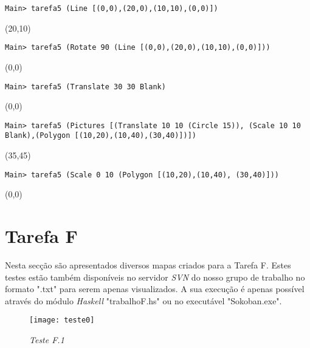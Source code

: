 \documentclass[a4paper,12pt]{report}
\begin{document}
\begin{tcolorbox}[width=\textwidth,colback={black},title={\sf Teste E.6:},outer arc=0mm,colupper=white]    
	{\footnotesize\tt *Main> tarefa5 (Line [(0,0),(20,0),(10,10),(0,0)])
		
		(20,10) }
\end{tcolorbox}

\begin{tcolorbox}[width=\textwidth,colback={black},title={\sf Teste E.7:},outer arc=0mm,colupper=white]    
	{\footnotesize\tt *Main> tarefa5 (Rotate 90 (Line [(0,0),(20,0),(10,10),(0,0)]))
		
		(0,0) }
\end{tcolorbox}

\begin{tcolorbox}[width=\textwidth,colback={black},title={\sf Teste E.8:},outer arc=0mm,colupper=white]    
	{\footnotesize\tt *Main> tarefa5 (Translate 30 30 Blank)
		
		(0,0) }
\end{tcolorbox}

\begin{tcolorbox}[width=\textwidth,colback={black},title={\sf Teste E.9:},outer arc=0mm,colupper=white]    
	{\footnotesize\tt *Main> tarefa5 (Pictures [(Translate 10 10 (Circle 15)), (Scale 10 10 Blank),(Polygon [(10,20),(10,40),(30,40)])])
		
		(35,45) }
\end{tcolorbox}

\begin{tcolorbox}[width=\textwidth,colback={black},title={\sf Teste E.10:},outer arc=0mm,colupper=white]    
	{\footnotesize\tt *Main> tarefa5 (Scale 0 10 (Polygon [(10,20),(10,40), (30,40)]))
		
		(0,0) }
	
\end{tcolorbox}


\section{Tarefa F}

Nesta secção são apresentados diversos mapas criados para a Tarefa F. Estes testes estão também disponíveis no servidor {\sl SVN} do nosso grupo de trabalho no formato ".txt" para serem apenas visualizados. A sua execução é apenas possível através do módulo {\sl Haskell} "trabalhoF.hs" ou no executável "Sokoban.exe".

\begin{figure}[h]
	\centering
	\texttt{[image: teste0]}
	\caption[]{\small\sl Teste F.1}
	\captionsetup[figure]{list=no}
\end{figure}
\end{document}
